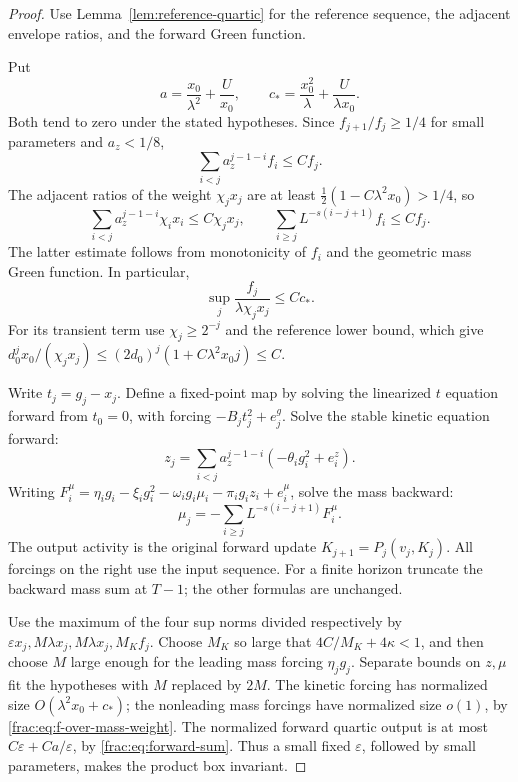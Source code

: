 \documentclass[11pt]{article}
\begin{document}
\begin{proof}
Use Lemma~\ref{lem:reference-quartic} for the reference sequence,
the adjacent envelope ratios, and the forward Green function.

Put
\[
 a=\frac{x_0}{\lambda^2}+\frac U{x_0},\qquad
 c_* =\frac{x_0^2}{\lambda}+\frac U{\lambda x_0}.
\]
Both tend to zero under the stated hypotheses. Since
\(f_{j+1}/f_j\ge1/4\) for small parameters and \(a_z<1/8\),
\[
 \sum_{i<j}a_z^{j-1-i}f_i\le C f_j.
\]
The adjacent ratios of the weight \(\chi_jx_j\) are at least \(\tfrac12(1-C\lambda^2x_0)>1/4\), so
\[
 \sum_{i<j}a_z^{j-1-i}\chi_i x_i\le C\chi_jx_j,
 \qquad
 \sum_{i\ge j}L^{-s(i-j+1)}f_i\le C f_j.
\]
The latter estimate follows from monotonicity of \(f_i\) and the
geometric mass Green function. In particular,
\begin{equation}\label{frac:eq:f-over-mass-weight}
 \sup_j\frac{f_j}{\lambda\chi_jx_j}\le Cc_*.
\end{equation}
For its transient term use \(\chi_j\ge2^{-j}\) and the reference
lower bound, which give
\(d_0^j x_0/(\chi_jx_j)\le
(2d_0)^j(1+C\lambda^2x_0j)\le C\).

Write \(t_j=g_j-x_j\). Define a fixed-point map by solving the
linearized \(t\) equation forward from \(t_0=0\), with forcing
\(-B_jt_j^2+e_j^g\). Solve the stable kinetic equation forward:
\[
 z_j=\sum_{i<j}a_z^{j-1-i}(-\theta_i g_i^2+e_i^z).
\]
Writing \(F_i^\mu=\eta_i g_i-\xi_i g_i^2-
\omega_i g_i\mu_i-\pi_i g_i z_i+e_i^\mu\), solve the mass
backward:
\[
 \mu_j=-\sum_{i\ge j}L^{-s(i-j+1)}F_i^\mu.
\]
The output activity is the original forward update
\(K_{j+1}=P_j(v_j,K_j)\). All forcings on the right use the input
sequence. For a finite horizon truncate the backward mass sum at
\(T-1\); the other formulas are unchanged.

Use the maximum of the four sup norms divided respectively by
\(\varepsilon x_j,M\lambda x_j,M\lambda x_j,M_Kf_j\).
Choose \(M_K\) so large that \(4C/M_K+4\kappa<1\), and then
choose \(M\) large enough for the leading mass forcing
\(\eta_jg_j\). Separate bounds on \(z,\mu\) fit the hypotheses
with \(M\) replaced by \(2M\). The kinetic forcing has normalized
size \(O(\lambda^2x_0+c_*)\); the nonleading mass forcings have
normalized size \(o(1)\), by
\eqref{frac:eq:f-over-mass-weight}. The normalized forward quartic
output is at most \(C\varepsilon+Ca/\varepsilon\), by
\eqref{frac:eq:forward-sum}. Thus a small fixed \(\varepsilon\),
followed by small parameters, makes the product box invariant.


\end{proof}
\end{document}
